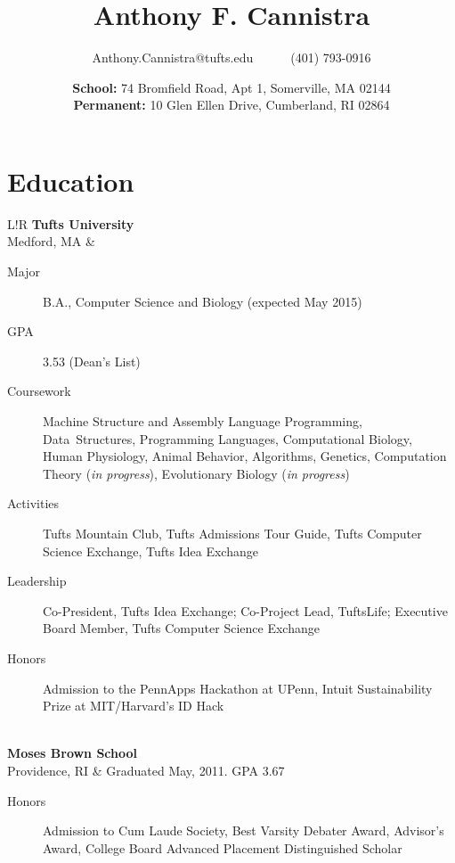 \documentclass[10pt, letter]{article}
\title{\vspace{-80pt}\bfseries Anthony F. Cannistra\vspace{-10pt}}
\author{Anthony.Cannistra@tufts.edu~~~~~~(401) 793-0916}
\date{\vspace{-6pt}\small{
\textbf{School:} 74 Bromfield Road, Apt 1, Somerville, MA 02144\\
\textbf{Permanent:} 10 Glen Ellen Drive, Cumberland, RI 02864
\vspace{-20pt}
}
}
\newcommand\VRule{\color{lightgray}\vrule width 0.5pt}
\begin{document}
\maketitle
\thispagestyle{empty}

\section*{Education}
\begin{tabular}{L!{\VRule}R}
\textbf{Tufts University} \\ Medford, MA &
\vspace{-16.7pt}
\begin{description}
\item[Major] B.A., Computer Science and Biology (expected May 2015)
\item[GPA] 3.53 (Dean's List)
\item[Coursework] Machine Structure and Assembly Language Programming, Data~Structures, Programming Languages, Computational Biology, Human Physiology, Animal Behavior, Algorithms, Genetics, Computation Theory ({\em in progress}), Evolutionary Biology ({\em in progress})
\item[Activities] Tufts Mountain Club, Tufts Admissions Tour Guide, Tufts Computer Science Exchange, Tufts Idea Exchange
\item[Leadership] Co-President, Tufts Idea Exchange; Co-Project Lead, TuftsLife; Executive Board Member, Tufts Computer Science Exchange
\item[Honors] Admission to the PennApps Hackathon at UPenn, Intuit Sustainability Prize at MIT/Harvard's ID Hack
\end{description} \\
\textbf{Moses Brown School} \\ Providence, RI &
Graduated May, 2011. GPA 3.67
\begin{description}
\item[Honors] Admission to Cum Laude Society, Best Varsity Debater Award, Advisor's Award, College Board Advanced Placement Distinguished Scholar
\end{description}
\end{tabular}

\vspace{-15pt}
\end{document}
